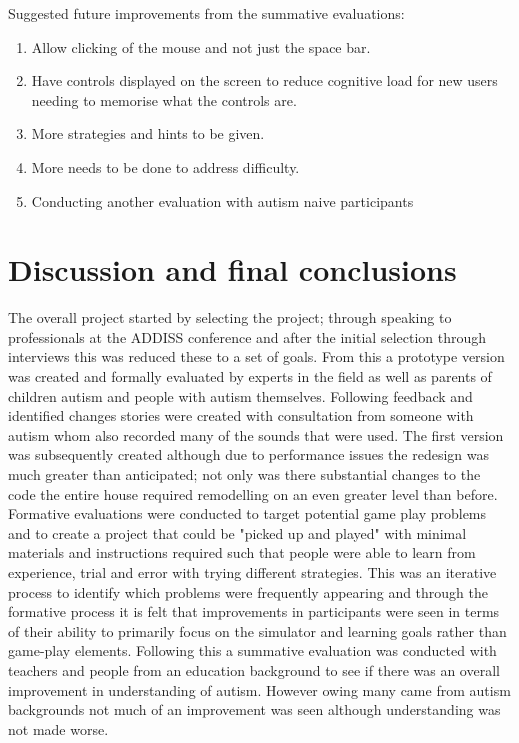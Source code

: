 \documentclass[11pt]{report}
\begin{document}
Suggested future improvements from the summative evaluations:
\begin{enumerate}
\item Allow clicking of the mouse and not just the space bar.
\item Have controls displayed on the screen to reduce cognitive load for new users needing to memorise what the controls are. 
\item More strategies and hints to be given. 
\item More needs to be done to address difficulty.
\item Conducting another evaluation with autism naive participants
\end{enumerate}

\chapter{Discussion and final conclusions}

The overall project started by selecting the project; through speaking to professionals at the ADDISS conference and after the initial selection through interviews this was reduced these to a set of goals.  
From this a prototype version was created and formally evaluated by experts in the field as well as parents of children autism and people with autism themselves. Following feedback and identified changes stories were created with consultation from someone with autism whom also recorded many of the sounds that were used.
The first version was subsequently created although due to performance issues the redesign was much greater than anticipated; not only was there substantial changes to the code the entire house required remodelling on an even greater level than before. 
Formative evaluations were conducted to target potential game play problems and to create a project that could be "picked up and played" with minimal materials and instructions required such that people were able to learn from experience, trial and error with trying different strategies. This was an iterative process to identify which problems were frequently appearing and through the formative process it is felt that improvements in participants were seen in terms of their ability to primarily focus on the simulator and learning goals rather than game-play elements. Following this a summative evaluation was conducted with teachers and people from an education background to see if there was an overall improvement in understanding of autism. However owing many came from autism backgrounds not much of an improvement was seen although understanding was not made worse.
\end{document}

